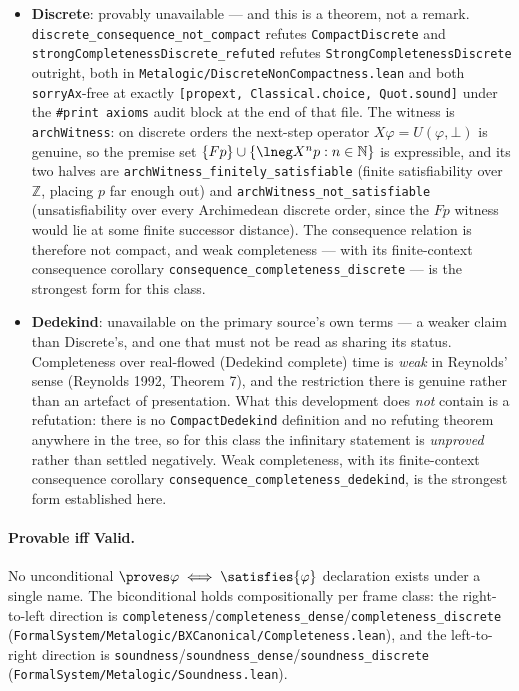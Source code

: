 \documentclass[../BimodalReference.tex]{subfiles}
\begin{document}
\begin{itemize}
    \texttt{set\_lindenbaum} in \texttt{FormalSystem/Metalogic/Core/MaximalConsistent.lean}) is
    already finitary and in place.
  \item \textbf{Discrete}: provably unavailable --- and this is a theorem, not a remark.
    \texttt{discrete\_consequence\_not\_compact} refutes \texttt{CompactDiscrete} and
    \texttt{strongCompletenessDiscrete\_refuted} refutes \texttt{StrongCompletenessDiscrete}
    outright, both in \texttt{Metalogic/DiscreteNonCompactness.lean} and both
    \texttt{sorryAx}-free at exactly \texttt{[propext, Classical.choice, Quot.sound]} under the
    \texttt{\#print axioms} audit block at the end of that file.
    The witness is \texttt{archWitness}: on discrete orders the next-step operator
    $X\varphi = U(\varphi, \bot)$ is genuine, so the premise set
    $\{F p\} \cup \{\lneg X^n p : n \in \mathbb{N}\}$ is expressible, and its two halves are
    \texttt{archWitness\_finitely\_satisfiable} (finite satisfiability over $\mathbb{Z}$, placing
    $p$ far enough out) and \texttt{archWitness\_not\_satisfiable} (unsatisfiability over every
    Archimedean discrete order, since the $F p$ witness would lie at some finite successor
    distance).
    The consequence relation is therefore not compact, and weak completeness --- with its
    finite-context consequence corollary \texttt{consequence\_completeness\_discrete} --- is the
    strongest form for this class.
  \item \textbf{Dedekind}: unavailable on the primary source's own terms --- a weaker claim
    than Discrete's, and one that must not be read as sharing its status.
    Completeness over real-flowed (Dedekind complete) time is \emph{weak} in Reynolds' sense
    (Reynolds 1992, Theorem 7), and the restriction there is genuine rather than an artefact of
    presentation.
    What this development does \emph{not} contain is a refutation: there is no
    \texttt{CompactDedekind} definition and no refuting theorem anywhere in the tree, so for this
    class the infinitary statement is \emph{unproved} rather than settled negatively.
    Weak completeness, with its finite-context consequence corollary
    \texttt{consequence\_completeness\_dedekind}, is the strongest form established here.
\end{itemize}

\paragraph{Provable iff Valid.}
No unconditional $\proves \varphi \iff \satisfies{\varphi}$ declaration exists under a single name.
The biconditional holds compositionally per frame class: the right-to-left direction is \texttt{completeness}/\texttt{completeness\_dense}/\texttt{completeness\_discrete} (\texttt{FormalSystem/Metalogic/BXCanonical/Completeness.lean}), and the left-to-right direction is \texttt{soundness}/\texttt{soundness\_dense}/\texttt{soundness\_discrete} (\texttt{FormalSystem/Metalogic/Soundness.lean}).
\end{document}
